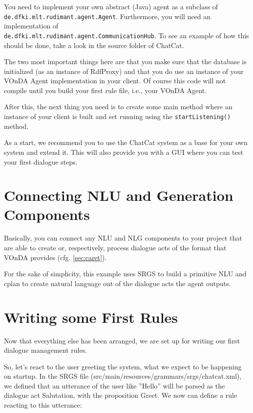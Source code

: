 \documentclass[a4paper]{report}
\newcommand{\vonda}{VOnDA\xspace}
\begin{document}
You need to implement your own abstract (Java) agent as a subclass of\\
\texttt{de.dfki.mlt.rudimant.agent.Agent}. Furthermore, you will need an
implementation of\\ \texttt{de.dfki.mlt.rudimant.agent.CommunicationHub}. To see
an example of how this should be done, take a look in the source folder of
ChatCat.

The two most important things here are that you make sure that the database is
initialized (as an instance of RdfProxy) and that you do use an instance of
your \vonda Agent implementation in your client. Of course this code will not
compile until you build your first rule file, i.e., your \vonda Agent.

After this, the next thing you need is to create some main method where an
instance of your client is built and set running using the
\texttt{startListening()} method.

As a start, we recommend you to use the ChatCat system as a base for your own
system and extend it. This will also provide you with a GUI where you can test
your first dialogue steps.

\section{Connecting NLU and Generation Components}

Basically, you can connect any NLU and NLG components to your project that are
able to create or, respectively, process dialogue acts of the format that
\vonda provides (cfg. \ref{sec:caret}).

For the sake of simplicity, this example uses SRGS to build a primitive NLU and
cplan to create natural language out of the dialogue acts the agent outputs.

\section{Writing some First Rules}

Now that everything else has been arranged, we are set up for writing our first
dialogue management rules.

So, let's react to the user greeting the system, what we expect to be happening
on startup. In the SRGS file (src/main/resources/grammars/srgs/chatcat.xml), we
defined that an utterance of the user like ''Hello'' will be parsed as the
dialogue act Salutation, with the proposition Greet. We now can define a rule
reacting to this utterance:
\end{document}
